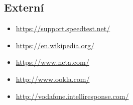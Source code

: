 \documentclass[12pt,a4paper]{article}
\begin{document}
\subsection{Externí}

\begin{itemize}
\item \href{https://support.speedtest.net/hc/en-us/articles/203845400-How-does-the-test-itself-work-How-is-the-result-calculated-}
	   {https://support.speedtest.net/}
\item \href{https://en.wikipedia.org/wiki/Speedtest.net}
	   {https://en.wikipedia.org/}
\item \href{https://www.ncta.com/platform/broadband-internet/how-do-internet-speed-tests-work-2/}
	   {https://www.ncta.com/}
\item \href{http://www.ookla.com/docs/UnderstandingBroadbandMeasurement.pdf}
	   {http://www.ookla.com/}
\item \href{http://vodafone.intelliresponse.com/index.jsp?id=1521&question=Speed+tests+and+data+usage&requestType=NormalRequest&source=100}
	   {http://vodafone.intelliresponse.com/}
\end{itemize}





%
%

%
%

\end{document}
